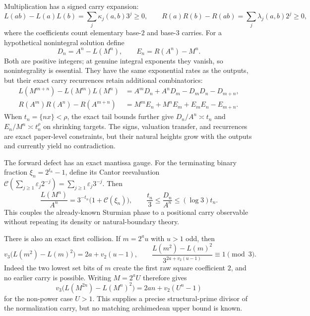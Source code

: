 \documentclass[11pt,oneside]{article}
\theoremstyle{definition}
\theoremstyle{remark}
\begin{document}
Multiplication has a signed carry expansion:
\begin{equation}
 L(ab)-L(a)L(b)=\sum_j\kappa_j(a,b)3^j\ge0,\qquad
 R(a)R(b)-R(ab)=\sum_j\lambda_j(a,b)2^j\ge0,
 \label{carry:eq-digit-multiplication}
\end{equation}
where the coefficients count elementary base-$2$ and base-$3$ carries.  For a hypothetical
nonintegral solution define
\[
 D_n=A^n-L(M^n),\qquad E_n=R(A^n)-M^n.
\]
Both are positive integers; at genuine integral exponents they vanish, so nonintegrality is
essential.  They have the same exponential rates as the outputs, but their exact carry
recurrences retain additional combinatorics:
\begin{align}
 L(M^{m+n})-L(M^m)L(M^n)
 &=A^mD_n+A^nD_m-D_mD_n-D_{m+n},\\
 R(A^m)R(A^n)-R(A^{m+n})
 &=M^mE_n+M^nE_m+E_mE_n-E_{m+n}.
 \label{carry:eq-digit-defect-recurrence}
\end{align}
When $t_n=\{nx\}<\rho$, the exact tail bounds further give
$D_n/A^n\asymp t_n$ and $E_n/M^n\asymp t_n^\rho$ on shrinking targets.  The signs,
valuation transfer, and recurrences are exact paper-level constraints, but their natural
heights grow with the outputs and currently yield no contradiction.

The forward defect has an exact mantissa gauge.  For the terminating binary fraction
$\xi_n=2^{t_n}-1$, define its Cantor reevaluation
$\mathcal C(\sum_{j\ge1}\varepsilon_j2^{-j})=\sum_{j\ge1}\varepsilon_j3^{-j}$.
Then
\begin{equation}
 \frac{L(M^n)}{A^n}=3^{-t_n}\bigl(1+\mathcal C(\xi_n)\bigr),
 \qquad
 \frac{t_n}{3}\le\frac{D_n}{A^n}\le(\log3)t_n.
 \label{carry:eq-mantissa-gauge}
\end{equation}
This couples the already-known Sturmian phase to a positional carry observable without
repeating its density or natural-boundary theory.

There is also an exact first collision.  If $m=2^au$ with $u>1$ odd, then
\begin{equation}
 v_3\bigl(L(m^2)-L(m)^2\bigr)=2a+v_2(u-1),\qquad
 \frac{L(m^2)-L(m)^2}{3^{2a+v_2(u-1)}}\equiv1\pmod3.
 \label{carry:eq-first-square-collision}
\end{equation}
Indeed the two lowest set bits of $m$ create the first raw square coefficient $2$, and no
earlier carry is possible.  Writing $M=2^aU$ therefore gives
\[
 v_3\bigl(L(M^{2n})-L(M^n)^2\bigr)=2an+v_2(U^n-1)
\]
for the non-power case $U>1$.  This supplies a precise structural-prime divisor of the
normalization carry, but no matching archimedean upper bound is known.
\end{document}
